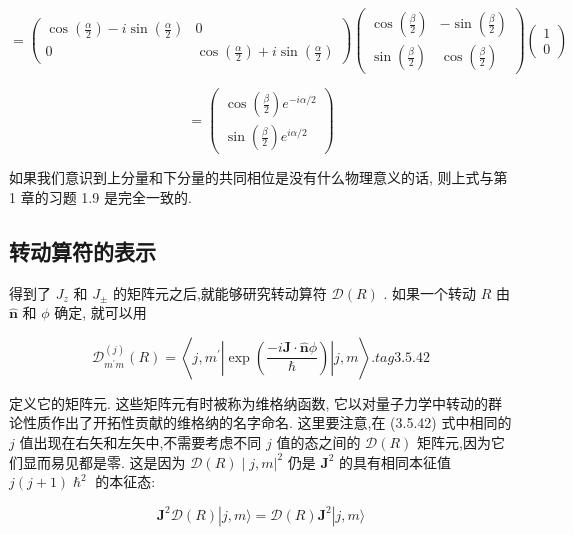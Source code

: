 $$
= \left( \begin{matrix} \cos \left( \frac{\alpha }{2}\right) - i\sin \left( \frac{\alpha }{2}\right) & 0 \\ 0 & \cos \left( \frac{\alpha }{2}\right) + i\sin \left( \frac{\alpha }{2}\right) \end{matrix}\right) \left( \begin{matrix} \cos \left( \frac{\beta }{2}\right) & - \sin \left( \frac{\beta }{2}\right) \\ \sin \left( \frac{\beta }{2}\right) & \cos \left( \frac{\beta }{2}\right) \end{matrix}\right) \left( \begin{array}{l} 1 \\ 0 \end{array}\right)
$$

$$
= \left( \begin{array}{l} \cos \left( \frac{\beta }{2}\right) {e}^{-{i\alpha }/2} \\ \sin \left( \frac{\beta }{2}\right) {e}^{{i\alpha }/2} \end{array}\right) 
$$

如果我们意识到上分量和下分量的共同相位是没有什么物理意义的话, 则上式与第 1 章的习题 1.9 是完全一致的.


\subsection{转动算符的表示}

得到了 ${J}_{z}$ 和 ${J}_{ \pm }$ 的矩阵元之后,就能够研究转动算符 $\mathcal{D}\left( R\right)$ . 如果一个转动 $R$ 由 $\widehat{\mathbf{n}}$ 和 $\phi$ 确定, 就可以用

$$
{\mathcal{D}}_{{m}^{\prime }m}^{\left( j\right) }\left( R\right) = \left\langle {j,{m}^{\prime }\left| {\exp \left( \frac{-i\mathbf{J} \cdot \widehat{\mathbf{n}}\phi }{\hslash }\right) }\right| j, m}\right\rangle . tag{3. 5.42}
$$

定义它的矩阵元. 这些矩阵元有时被称为维格纳函数, 它以对量子力学中转动的群论性质作出了开拓性贡献的维格纳的名字命名. 这里要注意,在 (3.5.42) 式中相同的 $j$ 值出现在右矢和左矢中,不需要考虑不同 $j$ 值的态之间的 $\mathcal{D}\left( R\right)$ 矩阵元,因为它们显而易见都是零. 这是因为 ${\left. \mathcal{D}\left( R\right) \mid j, m\right| }^{2}$ 仍是 ${\mathbf{J}}^{2}$ 的具有相同本征值 $j\left( {j + 1}\right) {\hslash }^{2}$ 的本征态:

$$
{\mathbf{J}}^{2}\mathcal{D}\left( R\right) \left| {j, m\rangle = \mathcal{D}\left( R\right) {\mathbf{J}}^{2}}\right| j, m\rangle 
$$


